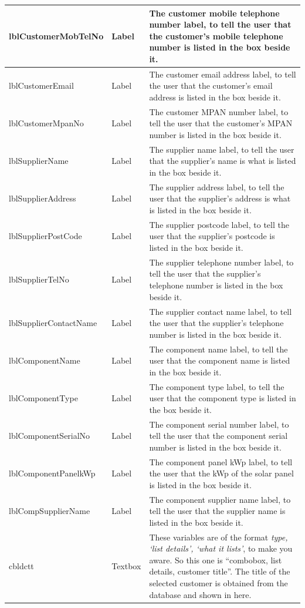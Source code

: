 \begin{longtable}{ | p{4cm} | p{3cm} | p{10cm} |}
		\hline
		lblCustomerMobTelNo & Label & The customer mobile telephone number label, to tell the user that the customer's mobile telephone number is listed in the box beside it.\\
		\hline
		lblCustomerEmail & Label & The customer email address label, to tell the user that the customer's email address is listed in the box beside it.\\
		\hline
		lblCustomerMpanNo & Label & The customer MPAN number label, to tell the user that the customer's MPAN number is listed in the box beside it.\\
		\hline
		lblSupplierName & Label & The supplier name label, to tell the user that the supplier's name is what is listed in the box beside it.\\
		\hline
		lblSupplierAddress & Label & The supplier address label, to tell the user that the supplier's address is what is listed in the box beside it.\\
		\hline
		lblSupplierPostCode & Label & The supplier postcode label, to tell the user that the supplier's postcode is listed in the box beside it.\\
		\hline
		lblSupplierTelNo & Label & The supplier telephone number label, to tell the user that the supplier's telephone number is listed in the box beside it.\\
		\hline
		lblSupplierContactName & Label & The supplier contact name label, to tell the user that the supplier's telephone number is listed in the box beside it.\\
		\hline
		lblComponentName & Label & The component name label, to tell the user that the component name is listed in the box beside it.\\
		\hline
		lblComponentType & Label & The component type label, to tell the user that the component type is listed in the box beside it.\\
		\hline
		lblComponentSerialNo & Label & The component serial number label, to tell the user that the component serial number is listed in the box beside it.\\
		\hline
		lblComponentPanelkWp & Label & The component panel kWp label, to tell the user that the kWp of the solar panel is listed in the box beside it.\\
		\hline
		lblCompSupplierName & Label & The component supplier name label, to tell the user that the supplier name is listed in the box beside it.\\
		\hline
		cbldctt & Textbox & These variables are of the format \textsl{type, `list details', `what it lists'}, to make you aware.  So this one is ``combobox, list details, customer title''.  The title of the selected customer is obtained from the database and shown in here.\\

\end{longtable}
